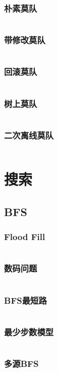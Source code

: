 \documentclass[a4paper,10pt]{article}
\begin{document}
\subsubsection{朴素莫队}
\inputminted[breaklines, linenos]{c++}{ds/mo.cc}
\subsubsection{带修改莫队}
\inputminted[breaklines, linenos]{c++}{ds/modify_mo.cc}
\subsubsection{回滚莫队}
\inputminted[breaklines, linenos]{c++}{ds/rollback_mo.cc}
\subsubsection{树上莫队}
\inputminted[breaklines, linenos]{c++}{ds/tree_mo.cc}
\subsubsection{二次离线莫队}
\inputminted[breaklines, linenos]{c++}{ds/offline_mo.cc}

\newpage  
\section{搜索}
\subsection{BFS}
\subsubsection{Flood Fill}
\inputminted[breaklines, linenos]{c++}{search/bfs/flood.cc}
\subsubsection{数码问题}
\inputminted[breaklines, linenos]{c++}{search/bfs/shuma.cc}
\subsubsection{BFS最短路}
\inputminted[breaklines, linenos]{c++}{search/bfs/path.cc}
\subsubsection{最少步数模型}
\inputminted[breaklines, linenos]{c++}{search/bfs/min_step.cc}
\subsubsection{多源BFS}
\inputminted[breaklines, linenos]{c++}{search/bfs/mul_source.cc}
\end{document}

